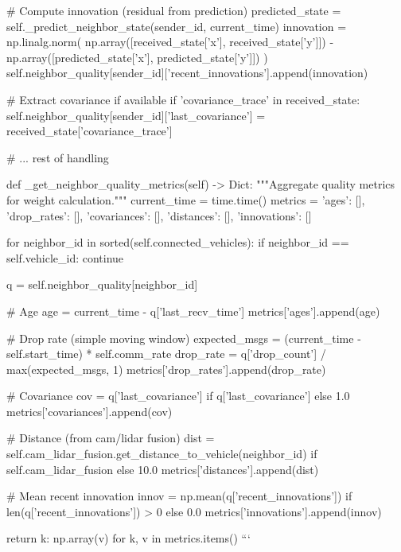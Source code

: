         # Compute innovation (residual from prediction)
        predicted_state = self._predict_neighbor_state(sender_id, current_time)
        innovation = np.linalg.norm(
            np.array([received_state['x'], received_state['y']]) - 
            np.array([predicted_state['x'], predicted_state['y']])
        )
        self.neighbor_quality[sender_id]['recent_innovations'].append(innovation)
        
        # Extract covariance if available
        if 'covariance_trace' in received_state:
            self.neighbor_quality[sender_id]['last_covariance'] = received_state['covariance_trace']
        
        # ... rest of handling
    
    def _get_neighbor_quality_metrics(self) -> Dict:
        """Aggregate quality metrics for weight calculation."""
        current_time = time.time()
        metrics = {
            'ages': [],
            'drop_rates': [],
            'covariances': [],
            'distances': [],
            'innovations': []
        }
        
        for neighbor_id in sorted(self.connected_vehicles):
            if neighbor_id == self.vehicle_id:
                continue
            
            q = self.neighbor_quality[neighbor_id]
            
            # Age
            age = current_time - q['last_recv_time']
            metrics['ages'].append(age)
            
            # Drop rate (simple moving window)
            expected_msgs = (current_time - self.start_time) * self.comm_rate
            drop_rate = q['drop_count'] / max(expected_msgs, 1)
            metrics['drop_rates'].append(drop_rate)
            
            # Covariance
            cov = q['last_covariance'] if q['last_covariance'] else 1.0
            metrics['covariances'].append(cov)
            
            # Distance (from cam/lidar fusion)
            dist = self.cam_lidar_fusion.get_distance_to_vehicle(neighbor_id) if self.cam_lidar_fusion else 10.0
            metrics['distances'].append(dist)
            
            # Mean recent innovation
            innov = np.mean(q['recent_innovations']) if len(q['recent_innovations']) > 0 else 0.0
            metrics['innovations'].append(innov)
        
        return {k: np.array(v) for k, v in metrics.items()}
```

